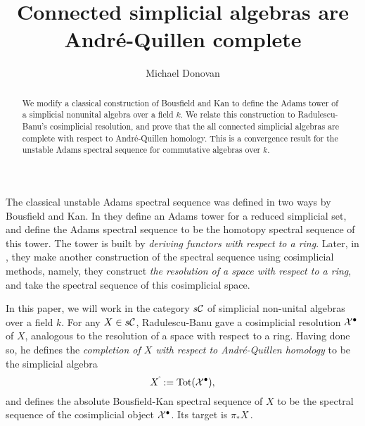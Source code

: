 \documentclass[11pt]{amsart}
\title{Connected simplicial algebras are Andr\'e-Quillen complete}
\author{Michael Donovan}
\theoremstyle{plain}
\begin{document}
\maketitle

\begin{abstract}
We modify a classical construction of Bousfield and Kan to define the Adams tower of a simplicial nonunital algebra over a field $k$. We relate this construction to Radulescu-Banu's cosimplicial resolution, and prove that the all connected simplicial algebras are complete with respect to Andr\'e-Quillen homology. This is a convergence result for the unstable Adams spectral sequence for commutative algebras over $k$.
\end{abstract}

The classical unstable Adams spectral sequence was defined in two ways by Bousfield and Kan. In \cite{BousKanSSeq.pdf} they define an Adams tower for a reduced simplicial set, and define the Adams spectral sequence to be the homotopy spectral sequence of this tower. The tower is built by \emph{deriving functors with respect to a ring}.
 Later, in \cite{BK_pairings_products.pdf}, they make another construction of the spectral sequence using cosimplicial methods, namely, they construct \emph{the resolution of a space with respect to a ring}, and take the spectral sequence of this cosimplicial space.

In this paper, we will work in the category $s\mathcal{C}$ of simplicial non-unital algebras over a field $k$. For any $X\in s\mathcal{C}$, Radulescu-Banu \cite{radelescuBanu.pdf} gave a cosimplicial resolution $\mathcal{X}^\bullet$ of $X$, analogous to the resolution of a space with respect to a ring. Having done so, he defines the \emph{completion of $X$ with respect to Andr\'e-Quillen homology} to be the simplicial algebra
\[X^{\hat\,}:=\textup{Tot}(\mathcal{X}^\bullet),\]
and defines the absolute Bousfield-Kan spectral sequence of $X$ to be the spectral sequence of the cosimplicial object $\mathcal{X}^\bullet$. Its target is $\pi_*X^{\hat\,}$. 
\end{document}
